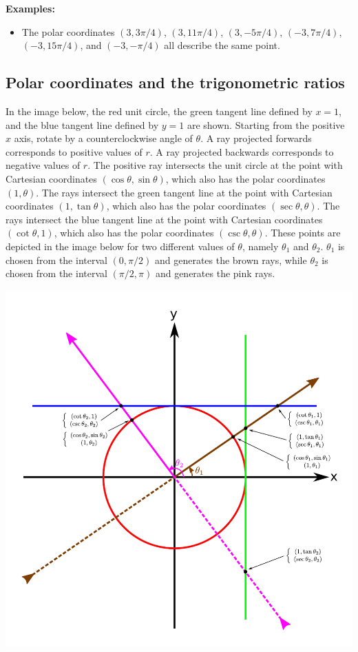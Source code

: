 \documentclass{article}
\begin{document}
\textbf{Examples:}
\begin{itemize}
\item The polar coordinates \((3, 3\pi/4)\), \((3, 11\pi/4)\), \((3, -5\pi/4)\), \((-3, 7\pi/4)\), \((-3, 15\pi/4)\), and \((-3, -\pi/4)\) all describe the same point.
\end{itemize}



\subsection*{Polar coordinates and the trigonometric ratios}

In the image below, the red unit circle, the green tangent line defined by \(x = 1\), and the blue tangent line defined by \(y = 1\) are shown. Starting from the positive \(x\) axis, rotate by a counterclockwise angle of \(\theta\). A ray projected forwards corresponds to positive values of \(r\). A ray projected backwards corresponds to negative values of \(r\). The positive ray intersects the unit circle at the point with Cartesian coordinates \((\cos\theta, \sin\theta)\), which also has the polar coordinates \((1, \theta)\). The rays intersect the green tangent line at the point with Cartesian coordinates \((1, \tan\theta)\), which also has the polar coordinates \((\sec\theta, \theta)\). The rays intersect the blue tangent line at the point with Cartesian coordinates \((\cot\theta, 1)\), which also has the polar coordinates \((\csc\theta, \theta)\). These points are depicted in the image below for two different values of \(\theta\), namely \(\theta_1\) and \(\theta_2\). \(\theta_1\) is chosen from the interval \((0,\pi/2)\) and generates the brown rays, while \(\theta_2\) is chosen from the interval \((\pi/2,\pi)\) and generates the pink rays.

\includegraphics[scale = 0.9]{the_unit_circle_and_polar_coordinates}
\end{document}
